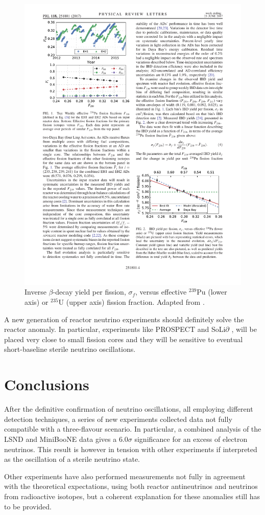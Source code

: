     \begin{figure}[htbp]
      \centering
      \captionsetup{margin=1.3cm}
      \includegraphics[width=0.75\linewidth]{figures/dayabay.pdf}
      \caption{Inverse $\beta$-decay yield per fission, $\sigma_f$, versus effective $^{239}$Pu (lower axis) or $^{235}$U (upper axis) fission fraction. Adapted from \cite{An:2017osx}.}
    \label{fig:dayabay}
    \end{figure}
    
    A new generation of reactor neutrino experiments should definitely solve the reactor anomaly. In particular, experiments like PROSPECT \cite{Ashenfelter:2015uxt} and SoLi$\partial$ \cite{Abreu:2017bpe}, will be placed very close to small fission cores and they will be sensitive to eventual short-baseline sterile neutrino oscillations.

\section{Conclusions}
After the definitive confirmation of neutrino oscillations, all employing different detection techniques, a series of new experiments collected data not fully compatible with a three-flavour scenario. In particular, a combined analysis of the LSND and MiniBooNE data gives a $6.0\sigma$ significance for an excess of electron neutrinos. This result is however in tension with other experiments if interpreted as the oscillation of a sterile neutrino state. 

Other experiments have also performed measurements not fully in agreement with the theoretical expectations, using both reactor antineutrinos and neutrinos from radioactive isotopes, but a coherent explanation for these anomalies still has to be provided. 